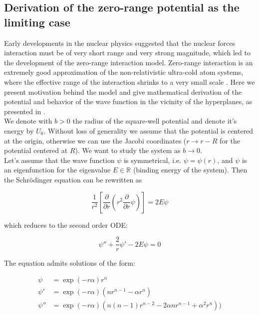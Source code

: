 \documentclass[11pt, a4paper, german]{article}
\theoremstyle{plain}
\theoremstyle{definition}
\theoremstyle{remark}
\numberwithin{equation}{section}
\numberwithin{theorem}{section}
\begin{document}
\subsection{Derivation of the zero-range potential as the limiting case}

Early developments in the nuclear physics suggested that the nuclear forces interaction must be of very short range and very strong magnitude, which led to the development of the zero-range interaction model. Zero-range interaction is an extremely good approximation of the non-relativistic ultra-cold atom systems, where the effective range of the interaction shrinks to a very small scale \cite{A2}. Here we present motivation behind the model and give mathematical derivation of the potential and behavior of the wave function in the vicinity of the hyperplanes, as presented in \cite{zero-range-potentials}.\\

We denote with $b>0$ the radius of the square-well potential and denote it's energy by $U_0$. Without loss of generality we assume that the potential is centered at the origin, otherwise we can use the Jacobi coordinates ($r \rightarrow r - R$ for the potential centered at $R$). We want to study the system as $b\rightarrow 0$.\\

Let's assume that the wave function $\psi$ is symmetrical, i.e. $\psi = \psi(r)$, and $\psi$ is an eigenfunction for the eigenvalue $E\in \mathbb R$ (binding energy of the system). Then the Schrödinger equation can be rewritten as

\begin{equation}
\frac{1}{r^2}\left[\frac{\partial}{\partial r} (r^2 \frac{\partial}{\partial r} \psi)\right] = 2E \psi
\end{equation}

which reduces to the second order ODE:

\begin{equation}
\psi''+\frac 2r \psi ' - 2E \psi = 0 \label{eq:schrodinger-in-r}
\end{equation}

The equation admits solutions of the form:

\begin{align}
\psi &= \exp(-r\alpha) r^n \\
\psi' &= \exp(-r\alpha) ( n r^{n-1}  - \alpha r^n)\\
\psi'' &= \exp(-r\alpha) (n(n-1) r^{n-2} - 2 \alpha n r^{n-1} + \alpha^2 r^n) )
\end{align}
\end{document}
